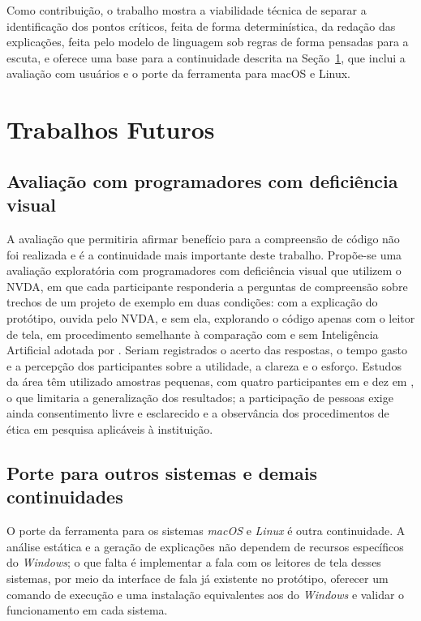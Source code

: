 \documentclass[
    12pt,                   %
    openright,              %
    oneside,                %
    a4paper,                %
    sumario=tradicional,    %
    english,                %
    brazil,                 %
    ]{abntex2}
\begin{document}
Como contribuição, o trabalho mostra a viabilidade técnica de separar a identificação dos pontos críticos, feita de forma determinística, da redação das explicações, feita pelo modelo de linguagem sob regras de forma pensadas para a escuta, e oferece uma base para a continuidade descrita na Seção~\ref{sec:futuros}, que inclui a avaliação com usuários e o porte da ferramenta para macOS e Linux.


\section{Trabalhos Futuros}\label{sec:futuros}

\subsection{Avaliação com programadores com deficiência visual}\label{sec:usuarios}

A avaliação que permitiria afirmar benefício para a compreensão de código não foi realizada e é a continuidade mais importante deste trabalho. Propõe-se uma avaliação exploratória com programadores com deficiência visual que utilizem o NVDA, em que cada participante responderia a perguntas de compreensão sobre trechos de um projeto de exemplo em duas condições: com a explicação do protótipo, ouvida pelo NVDA, e sem ela, explorando o código apenas com o leitor de tela, em procedimento semelhante à comparação com e sem Inteligência Artificial adotada por \textcite{latinoware34224}. Seriam registrados o acerto das respostas, o tempo gasto e a percepção dos participantes sobre a utilidade, a clareza e o esforço. Estudos da área têm utilizado amostras pequenas, com quatro participantes em \textcite{latinoware34224} e dez em \textcite{latinoware20457}, o que limitaria a generalização dos resultados; a participação de pessoas exige ainda consentimento livre e esclarecido e a observância dos procedimentos de ética em pesquisa aplicáveis à instituição.

\subsection{Porte para outros sistemas e demais continuidades}

O porte da ferramenta para os sistemas \textit{macOS} e \textit{Linux} é outra continuidade. A análise estática e a geração de explicações não dependem de recursos específicos do \textit{Windows}; o que falta é implementar a fala com os leitores de tela desses sistemas, por meio da interface de fala já existente no protótipo, oferecer um comando de execução e uma instalação equivalentes aos do \textit{Windows} e validar o funcionamento em cada sistema.
\end{document}
